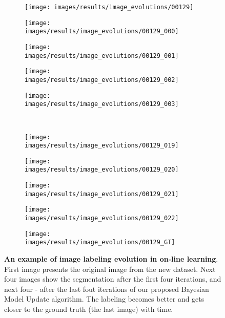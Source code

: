 \begin{figure}[t]
 \centering
 \begin{subfigure}[c]{0.19\textwidth}
  \centering
  \texttt{[image: images/results/image\_evolutions/00129]}
 \end{subfigure}
 \begin{subfigure}[c]{0.19\textwidth}
  \centering
  \texttt{[image: images/results/image\_evolutions/00129\_000]}
 \end{subfigure}
 \begin{subfigure}[c]{0.19\textwidth}
  \centering
  \texttt{[image: images/results/image\_evolutions/00129\_001]}
 \end{subfigure}
 \begin{subfigure}[c]{0.19\textwidth}
  \centering
  \texttt{[image: images/results/image\_evolutions/00129\_002]}
 \end{subfigure}
 \begin{subfigure}[c]{0.19\textwidth}
  \centering
  \texttt{[image: images/results/image\_evolutions/00129\_003]}
 \end{subfigure}
 \\
 \begin{subfigure}[c]{0.19\textwidth}
  \centering
  \texttt{[image: images/results/image\_evolutions/00129\_019]}
 \end{subfigure}
 \begin{subfigure}[c]{0.19\textwidth}
  \centering
  \texttt{[image: images/results/image\_evolutions/00129\_020]}
 \end{subfigure}
 \begin{subfigure}[c]{0.19\textwidth}
  \centering
  \texttt{[image: images/results/image\_evolutions/00129\_021]}
 \end{subfigure}
 \begin{subfigure}[c]{0.19\textwidth}
  \centering
  \texttt{[image: images/results/image\_evolutions/00129\_022]}
 \end{subfigure}
 \begin{subfigure}[c]{0.19\textwidth}
  \centering
  \texttt{[image: images/results/image\_evolutions/00129\_GT]}
 \end{subfigure}
 
 \caption[An example of image labeling evolution in on-line learning]{
 {\bf An example of image labeling evolution in on-line learning}. 
 First image presents the original image from the new dataset. Next four images show the segmentation after the first four iterations, and next four - 
 after the last fout iterations of our proposed Bayesian Model Update algorithm. The labeling becomes better and gets closer to the ground truth (the last
 image) with time.}
 \label{fig:image_evolution_teaser}
\end{figure}

